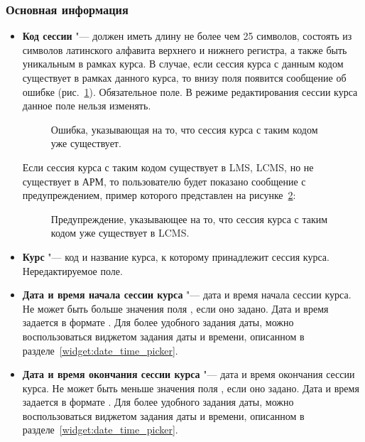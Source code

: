 	\subsubsection{Основная информация}
	\begin{itemize}
		\item \textbf{Код сессии} "--- должен иметь длину не более чем 25 символов, состоять из символов латинского алфавита верхнего и нижнего регистра, а также быть уникальным в рамках курса. В случае, если сессия курса с данным кодом существует в рамках данного курса, то внизу поля появится сообщение об ошибке (рис.~\ref{img:course_session:slug_error}). Обязательное поле. В режиме редактирования сессии курса данное поле нельзя изменять.
		\begin{figure}[H]
			\caption{Ошибка, указывающая на то, что сессия курса с таким кодом уже существует.}
			\label{img:course_session:slug_error}
		\end{figure}
		
		Если сессия курса с таким кодом существует в LMS, LCMS, но не существует в АРМ, то пользователю будет показано сообщение с предупреждением, пример которого представлен на рисунке~\ref{img:course_session:slug_warning}:
		\begin{figure}[H]
			\caption{Предупреждение, указывающее на то, что сессия курса с таким кодом уже существует в LCMS.}
			\label{img:course_session:slug_warning}
		\end{figure}
		
		\item \textbf{Курс} "--- код и название курса, к которому принадлежит сессия курса. Нередактируемое поле.
		\item \textbf{Дата и время начала сессии курса} "--- дата и время начала сессии курса. Не может быть больше значения поля , если оно задано. Дата и время задается в формате . Для более удобного задания даты, можно воспользоваться виджетом задания даты и времени, описанном в разделе~\ref{widget:date_time_picker}.
		
		\item \textbf{Дата и время окончания сессии курса} "--- дата и время окончания сессии курса. Не может быть меньше значения поля , если оно задано. Дата и время задается в формате . Для более удобного задания даты, можно воспользоваться виджетом задания даты и времени, описанном в разделе~\ref{widget:date_time_picker}.
		

\end{itemize}

